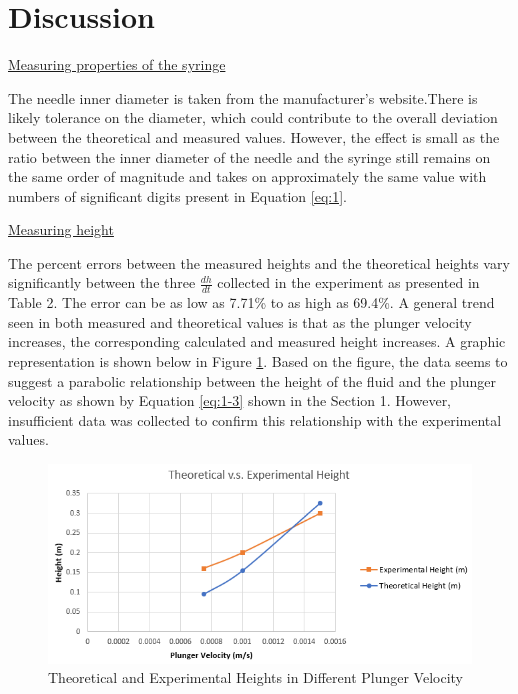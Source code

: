 \documentclass{article}
\begin{document}
\section{Discussion}
\underline{Measuring properties of the syringe}

The needle inner diameter is taken from the manufacturer's website.There is likely tolerance on the diameter, which could contribute to the overall deviation between the theoretical and measured values. However, the effect is small as the ratio between the inner diameter of the needle and the syringe still remains on the same order of magnitude and takes on approximately the same value with numbers of significant digits present in Equation \ref{eq:1}.

\noindent\underline{Measuring height}

The percent errors between the measured heights and the theoretical heights vary significantly between the three $\frac{dh}{dt}$ collected in the experiment as presented in Table 2. The error can be as low as 7.71\% to as high as 69.4\%. A general trend seen in both measured and theoretical values is that as the plunger velocity increases, the corresponding calculated and measured height  increases. A graphic representation is shown below in Figure \ref{fig:3}. Based on the figure, the data seems to suggest a parabolic relationship between the height of the fluid and the plunger velocity as shown by Equation \ref{eq:1-3} shown in the Section 1. However, insufficient data was collected to confirm this relationship with the experimental values.

\begin{figure}[h!]
\centering
  \includegraphics[width=150mm]{graph.png}
  \captionsetup{justification=centering}
  \caption{Theoretical and Experimental Heights in Different Plunger Velocity}
  \label{fig:3}
\end{figure}
\end{document}
